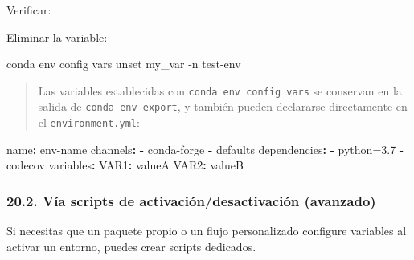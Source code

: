 \documentclass[
  doc,
  floatsintext,
  longtable,
  a4paper,
  nolmodern,
  notxfonts,
  notimes,
  12pt,
  colorlinks=true,linkcolor=blue,citecolor=blue,urlcolor=blue]{apa7}
\newenvironment{Shaded}{\begin{snugshade}}{\end{snugshade}}
\newcommand{\AttributeTok}[1]{\textcolor[rgb]{0.40,0.45,0.13}{#1}}
\newcommand{\BuiltInTok}[1]{\textcolor[rgb]{0.00,0.23,0.31}{#1}}
\newcommand{\CommentTok}[1]{\textcolor[rgb]{0.37,0.37,0.37}{#1}}
\newcommand{\ExtensionTok}[1]{\textcolor[rgb]{0.00,0.23,0.31}{#1}}
\newcommand{\FunctionTok}[1]{\textcolor[rgb]{0.28,0.35,0.67}{#1}}
\newcommand{\KeywordTok}[1]{\textcolor[rgb]{0.00,0.23,0.31}{\textbf{#1}}}
\newcommand{\NormalTok}[1]{\textcolor[rgb]{0.00,0.23,0.31}{#1}}
\newcommand{\VariableTok}[1]{\textcolor[rgb]{0.07,0.07,0.07}{#1}}
\begin{document}
Verificar:

\begin{Shaded}
\end{Shaded}

Eliminar la variable:

\begin{Shaded}
\begin{Highlighting}[]
\ExtensionTok{conda}\NormalTok{ env config vars unset my\_var }\AttributeTok{{-}n}\NormalTok{ test{-}env}
\end{Highlighting}
\end{Shaded}

\begin{quote}
Las variables establecidas con \texttt{conda\ env\ config\ vars} se
conservan en la salida de \texttt{conda\ env\ export}, y también pueden
declararse directamente en el \texttt{environment.yml}:
\end{quote}

\begin{Shaded}
\begin{Highlighting}[]
\FunctionTok{name}\KeywordTok{:}\AttributeTok{ env{-}name}
\FunctionTok{channels}\KeywordTok{:}
\AttributeTok{  }\KeywordTok{{-}}\AttributeTok{ conda{-}forge}
\AttributeTok{  }\KeywordTok{{-}}\AttributeTok{ defaults}
\FunctionTok{dependencies}\KeywordTok{:}
\AttributeTok{  }\KeywordTok{{-}}\AttributeTok{ python=3.7}
\AttributeTok{  }\KeywordTok{{-}}\AttributeTok{ codecov}
\FunctionTok{variables}\KeywordTok{:}
\AttributeTok{  }\FunctionTok{VAR1}\KeywordTok{:}\AttributeTok{ valueA}
\AttributeTok{  }\FunctionTok{VAR2}\KeywordTok{:}\AttributeTok{ valueB}
\end{Highlighting}
\end{Shaded}

\subsubsection{20.2. Vía scripts de activación/desactivación
(avanzado)}\label{vuxeda-scripts-de-activaciuxf3ndesactivaciuxf3n-avanzado}

Si necesitas que un paquete propio o un flujo personalizado configure
variables al activar un entorno, puedes crear scripts dedicados.
\end{document}
